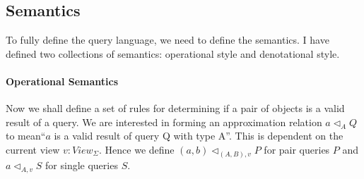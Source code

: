 \documentclass[12pt,a4paper,twoside,openright]{report}
\newcommand{\opRule}[3]{#1 \triangleleft_{#2, v} #3}
\let\oldparagraph\paragraph
\renewcommand{\paragraph}[1]{\oldparagraph{#1}\mbox{}}
\begin{document}
\subsection{Semantics}
   To fully define the query language, we need to define the semantics. I have defined two collections of semantics: operational style and denotational style.
\paragraph{Operational Semantics}   

Now we shall define a set of rules for determining if a pair of objects is a valid result of a query. We are interested in forming an approximation relation $a \triangleleft_A Q$ to mean``$a$ is a valid result of query Q with type A''. This is dependent on the current view $v: View_{\Sigma}$. Hence we define $\opRule{(a, b)}{(A, B)}{P}$ for pair queries $P$ and $\opRule{a}{A}{S}$ for single queries $S$.
\end{document}
